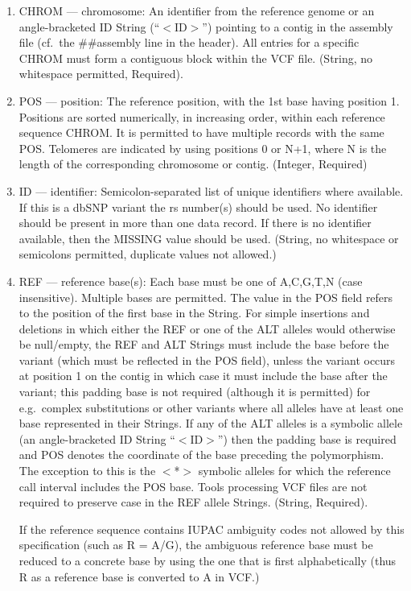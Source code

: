 \documentclass[8pt]{article}
\begin{document}
\begin{enumerate}
  \item CHROM --- chromosome: An identifier from the reference genome or an angle-bracketed ID String (``$<$ID$>$'') pointing to a contig in the assembly file (cf.\ the \#\#assembly line in the header).
  All entries for a specific CHROM must form a contiguous block within the VCF file.
  (String, no whitespace permitted, Required).
  \item POS --- position: The reference position, with the 1st base having position 1.
  Positions are sorted numerically, in increasing order, within each reference sequence CHROM.
  It is permitted to have multiple records with the same POS.
  Telomeres are indicated by using positions 0 or N+1, where N is the length of the corresponding chromosome or contig.
  (Integer, Required)
  \item ID --- identifier: Semicolon-separated list of unique identifiers where available.
  If this is a dbSNP variant the rs number(s) should be used.
  No identifier should be present in more than one data record.
  If there is no identifier available, then the MISSING value should be used.
  (String, no whitespace or semicolons permitted, duplicate values not allowed.)
  \item REF --- reference base(s): Each base must be one of A,C,G,T,N (case insensitive).
  Multiple bases are permitted.
  The value in the POS field refers to the position of the first base in the String.
  For simple insertions and deletions in which either the REF or one of the ALT alleles would otherwise be null/empty, the REF and ALT Strings must include the base before the variant (which must be reflected in the POS field), unless the variant occurs at position 1 on the contig in which case it must include the base after the variant; \pagebreak[1] this padding base is not required (although it is permitted) for e.g.\ complex substitutions or other variants where all alleles have at least one base represented in their Strings.
  If any of the ALT alleles is a symbolic allele (an angle-bracketed ID String ``$<$ID$>$'') then the padding base is required and POS denotes the coordinate of the base preceding the polymorphism.
  The exception to this is the $<$*$>$ symbolic alleles for which the reference call interval includes the POS base.
  Tools processing VCF files are not required to preserve case in the REF allele Strings. (String, Required).

  If the reference sequence contains IUPAC ambiguity codes not allowed by this specification (such as R = A/G), the ambiguous reference base must be reduced to a concrete base by using the one that is first alphabetically (thus R as a reference base is converted to A in VCF.)


\end{enumerate}
\end{document}
